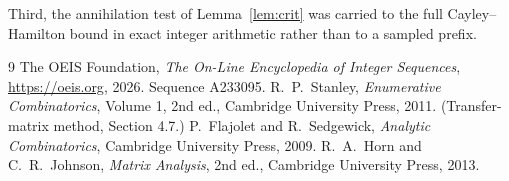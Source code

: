 \documentclass[11pt,a4paper]{article}
\theoremstyle{plain}
\theoremstyle{definition}
\begin{document}
Third, the annihilation test of Lemma~\ref{lem:crit} was carried to the full
Cayley--Hamilton bound in exact integer arithmetic rather than to a sampled prefix.

\begin{thebibliography}{9}
 The OEIS Foundation, \emph{The On-Line Encyclopedia of Integer
Sequences}, \url{https://oeis.org}, 2026. Sequence A233095.
 R.~P.~Stanley, \emph{Enumerative Combinatorics}, Volume 1, 2nd ed.,
Cambridge University Press, 2011. (Transfer-matrix method, Section 4.7.)
 P.~Flajolet and R.~Sedgewick, \emph{Analytic Combinatorics}, Cambridge
University Press, 2009.
 R.~A.~Horn and C.~R.~Johnson, \emph{Matrix Analysis}, 2nd ed., Cambridge
University Press, 2013.
\end{thebibliography}
\end{document}
